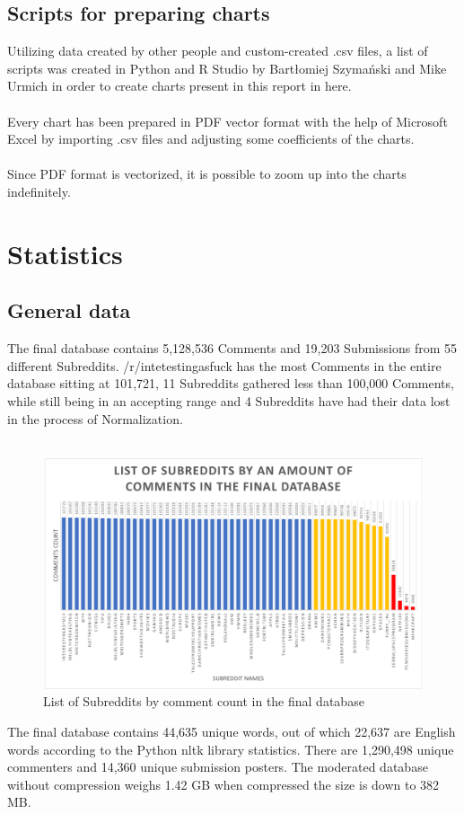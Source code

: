 \documentclass[openany]{article}
\begin{document}
\subsection{Scripts for preparing charts}
Utilizing data created by other people and custom-created .csv files, a list of scripts was created in Python and R Studio by Bartłomiej Szymański and Mike Urmich in order to create charts present in this report in here.\\ \\
Every chart has been prepared in PDF vector format with the help of Microsoft Excel by importing .csv files and adjusting some coefficients of the charts.\\ \\
Since PDF format is vectorized, it is possible to zoom up into the charts indefinitely.

\newpage
\section{Statistics}
\subsection{General data}
The final database contains 5,128,536 Comments and 19,203 Submissions from 55 different Subreddits. /r/intetestingasfuck has the most Comments in the entire database sitting at 101,721, 11 Subreddits gathered less than 100,000 Comments, while still being in an accepting range and 4 Subreddits have had their data lost in the process of Normalization.\\ \\
\begin{figure}[H]
    \centering
    \includegraphics[width=\textwidth]{subredditsbywords.pdf}
    \caption{List of Subreddits by comment count in the final database}
    \label{fig:mesh1}
\end{figure}
The final database contains 44,635 unique words, out of which 22,637 are English words according to the Python nltk library statistics. There are 1,290,498 unique commenters and 14,360 unique submission posters.
The moderated database without compression weighs 1.42 GB when compressed the size is down to 382 MB.
\end{document}
